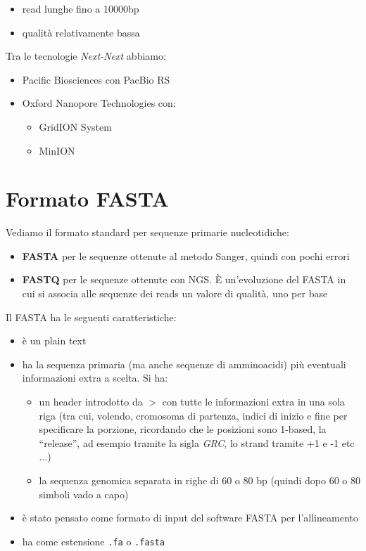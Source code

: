 \documentclass[a4paper,12pt, oneside]{book}
\begin{document}
\begin{itemize}
\begin{itemize}
    \item {\color{OliveGreen}read lunghe fino a 10000bp}
    \item {\color{OliveGreen}qualità relativamente bassa}
  \end{itemize}
  Tra le tecnologie \textit{Next-Next} abbiamo:
  \begin{itemize}
    \item Pacific Biosciences con PacBio RS
    \item Oxford Nanopore Technologies con:
    \begin{itemize}
      \item GridION System 
      \item MinION
    \end{itemize}
  \end{itemize}
\end{itemize}
\section{Formato FASTA}
Vediamo il formato standard per sequenze primarie nucleotidiche:
\begin{itemize}
  \item \textbf{FASTA} per le sequenze ottenute al metodo Sanger, quindi con
  pochi errori 
  \item \textbf{FASTQ} per le sequenze ottenute con NGS. È un'evoluzione del
  FASTA in cui si associa alle sequenze dei reads un valore di qualità, uno per
  base 
\end{itemize}
Il FASTA ha le seguenti caratteristiche:
\begin{itemize}
  \item è un plain text
  \item ha la sequenza primaria (ma anche sequenze di amminoacidi) più
  eventuali informazioni extra a scelta. Si ha:
  \begin{itemize}
    \item un header introdotto da $>$ con tutte le informazioni extra in una
    sola riga (tra cui, volendo, cromosoma di partenza, indici di inizio e fine
    per specificare la porzione, ricordando che le posizioni sono 1-based, la
    ``release'', ad esempio tramite la sigla \textit{GRC}, lo strand tramite +1
    e -1 etc$\ldots$)  
    \item la sequenza genomica separata in righe di 60 o 80 bp (quindi dopo 60 o
    80 simboli vado a capo)
  \end{itemize}
  \item è stato pensato come formato di input del software FASTA per
  l'allineamento
  \item ha come estensione \texttt{.fa} o \texttt{.fasta}
\end{itemize}
\end{document}
